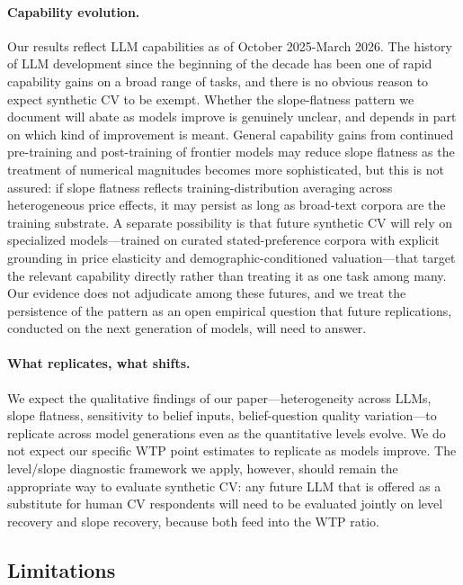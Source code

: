 \documentclass[12pt]{article}
\begin{document}
\paragraph{Capability evolution.} Our results reflect LLM capabilities
as of October 2025-March 2026. The history of LLM development since
the beginning of the decade has been one of rapid capability gains on a broad range
of tasks, and there is no obvious reason to expect synthetic CV to be
exempt. Whether the slope-flatness pattern we document will abate as
models improve is genuinely unclear, and depends in part on which kind
of improvement is meant. General capability gains from continued
pre-training and post-training of frontier models may reduce slope
flatness as the treatment of numerical magnitudes becomes more
sophisticated, but this is not assured: if slope flatness reflects
training-distribution averaging across heterogeneous price effects, it
may persist as long as broad-text corpora are the training substrate.
A separate possibility is that future synthetic CV will rely on
specialized models---trained on curated stated-preference corpora with
explicit grounding in price elasticity and demographic-conditioned
valuation---that target the relevant capability directly rather than
treating it as one task among many. Our evidence does not adjudicate
among these futures, and we treat the persistence of the pattern as an
open empirical question that future replications, conducted on the next
generation of models, will need to answer.

\paragraph{What replicates, what shifts.} We expect the qualitative
findings of our paper---heterogeneity across LLMs, slope flatness,
sensitivity to belief inputs, belief-question quality variation---to
replicate across model generations even as the quantitative levels
evolve. We do not expect our specific WTP point estimates to replicate
as models improve. The level/slope diagnostic framework we apply,
however, should remain the appropriate way to evaluate synthetic CV:
any future LLM that is offered as a substitute for human CV respondents
will need to be evaluated jointly on level recovery and slope recovery,
because both feed into the WTP ratio.

\subsection{Limitations}\label{sec:disc-limitations}
\end{document}

